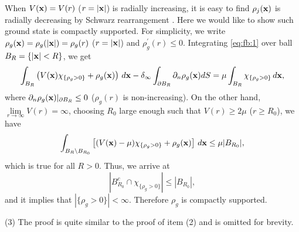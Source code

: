 \documentclass{elsarticle}
\newcommand{\be}{\begin{equation}}
\newcommand{\ee}{\end{equation}}
\newcommand{\bx}{{\bf x} }
\begin{document}
 When $V(\bx)=V(r)$ ($r=|\bx|$) is radially increasing, it is easy to find $\rho_j(\bx)$ is radially decreasing  by Schwarz rearrangement \cite{LiebL}. Here we would like to show such ground state is compactly supported.
For simplicity, we write $\rho_g(\bx)=\rho_g(|\bx|)=\rho_g(r)$ ($r=|\bx|$) and $\rho_g^\prime(r)\leq0$. Integrating \eqref{eq:fb:1} over ball $B_R=\{|\bx|< R\}$, we get
\begin{equation*}
\int_{B_R} \left(V(\bx)\chi_{\{\rho_g>0\}}+\rho_g(\bx)\right)\,d\bx-\delta_{\infty}\int_{\partial B_R}\partial_{n}\rho_g(\bx)dS=\mu\int_{B_R}\chi_{\{\rho_g>0\}}\,d\bx,
\end{equation*}
where $\partial_{n}\rho_g(\bx)|_{\partial B_R}\leq0$ ($\rho_g(r)$ is non-increasing). On the other hand, $\lim\limits_{r\to\infty}V(r)=\infty$, choosing $R_0$ large enough such that
$V(r)\ge2\mu$ ($r\ge R_0$),  we have
\begin{equation*}
\int_{B_R \setminus B_{R_0}} \left[(V(\bx)-\mu)\chi_{\{\rho_g>0\}}+\rho_g(\bx)\right]\,d\bx\leq \mu |B_{R_0}|,
\end{equation*}
which is true for all $R>0$. Thus, we arrive at
\be
|B_{R_0}^c\cap \chi_{\{\rho_g>0\}}|\leq|B_{R_0}|,
\ee
and it implies that $|\{\rho_g>0\}|<\infty$. Therefore $\rho_g$ is compactly supported.

(3) The proof is quite similar to the proof of item (2) and is omitted for brevity.
\end{document}
